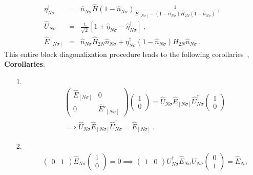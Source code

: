 \documentclass[12pt,a4paper]{article}
\begin{document}
\begin{eqnarray}
\eta^{\dagger}_{N\sigma} &=& \hat{n}_{N\sigma}\hat{H}(1-\hat{n}_{N\sigma})\frac{1}{\hat{E}_{[N\sigma]} - (1-\hat{n}_{N\sigma})\hat{H}_{2N}(1-\hat{n}_{N\sigma})}~,~\nonumber\\
\hat{U}_{N\sigma} &=& \frac{1}{\sqrt{2}}\left[1+\hat{\eta}_{N\sigma}-\hat{\eta}^{\dagger}_{N\sigma}\right]~,~\nonumber\\
\hat{E}_{[N\sigma]} &=& \hat{n}_{N\sigma}\hat{H}_{2N}\hat{n}_{N\sigma} + \eta^{\dagger}_{N\sigma}(1-\hat{n}_{N\sigma})\hat{H}_{2N}\hat{n}_{N\sigma}~.
\end{eqnarray}
This entire block diagonalization procedure leads to the following corollaries~,\\
\textbf{Corollaries}: \\
\begin{itemize}
\item[1.]\begin{eqnarray}
&&\begin{pmatrix}
			\hat{E}_{[N\sigma]}							 & 0\\
				0					& \hat{E}'_{[N\sigma]}
											\end{pmatrix}\begin{pmatrix}
											1 \\ 0
											\end{pmatrix}=\hat{U}_{N\sigma}\hat{E}_{[N\sigma]}\hat{U}^{\dagger}_{N\sigma}\begin{pmatrix}
											1 \\ 0
											\end{pmatrix} \nonumber\\
											&&\implies  \hat{U}_{N\sigma}\hat{E}_{[N\sigma]}\hat{U}^{\dagger}_{N\sigma}=\hat{E}_{[N\sigma]}~.\label{corollary_Unitary}
\end{eqnarray}
\item[2.]\begin{eqnarray}
&& \begin{pmatrix}0 & 1\end{pmatrix} \hat{E}_{N\sigma} \begin{pmatrix}
1  \\ 0
\end{pmatrix}  = 0 \implies \begin{pmatrix}
 1 & 0
\end{pmatrix}U^{\dagger}_{N\sigma}\hat{E}_{N\sigma}U_{N\sigma} \begin{pmatrix}
 0 \\ 1
\end{pmatrix} =\hat{E}_{N\sigma}\nonumber\\

\end{eqnarray}
\end{itemize}
\end{document}
